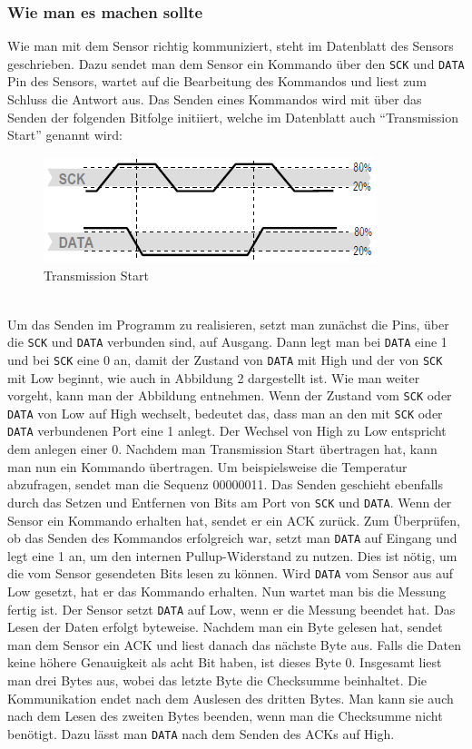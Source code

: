 \documentclass[]{article}
\begin{document}
\subsubsection{Wie man es machen sollte}
Wie man mit dem Sensor richtig kommuniziert, steht im Datenblatt des Sensors geschrieben. Dazu sendet man dem Sensor ein Kommando über den \texttt{SCK} und \texttt{DATA} Pin des Sensors, wartet auf die Bearbeitung des Kommandos und liest zum Schluss die Antwort aus. 
Das Senden eines Kommandos wird mit über das Senden der folgenden Bitfolge initiiert, welche im Datenblatt auch "`Transmission Start"' genannt wird: 
\begin{figure}[h]
	\centering
	\includegraphics[width=0.5\columnwidth]{transmission_start.png}
	\caption{Transmission Start}
\end{figure}
\\ Um das Senden im Programm zu realisieren, setzt man zunächst die Pins, über die \texttt{SCK} und \texttt{DATA} verbunden sind, auf Ausgang. Dann legt man bei \texttt{DATA} eine 1 und bei \texttt{SCK} eine 0 an, damit der Zustand von \texttt{DATA} mit High und der von \texttt{SCK} mit Low beginnt, wie auch in Abbildung 2 dargestellt ist. Wie man weiter vorgeht, kann man der Abbildung entnehmen. Wenn der Zustand vom \texttt{SCK} oder \texttt{DATA} von Low auf High wechselt, bedeutet das, dass man an den mit \texttt{SCK} oder \texttt{DATA} verbundenen Port eine 1 anlegt. Der Wechsel von High zu Low entspricht dem anlegen einer 0. Nachdem man Transmission Start übertragen hat, kann man nun ein Kommando übertragen. Um beispielsweise die Temperatur abzufragen, sendet man die Sequenz 00000011. Das Senden geschieht ebenfalls durch das Setzen und Entfernen von Bits am Port von \texttt{SCK} und \texttt{DATA}. Wenn der Sensor ein Kommando erhalten hat, sendet er ein ACK zurück. Zum Überprüfen, ob das Senden des Kommandos erfolgreich war, setzt man \texttt{DATA} auf Eingang und legt eine 1 an, um den internen Pullup-Widerstand zu nutzen. Dies ist nötig, um die vom Sensor gesendeten Bits lesen zu können. Wird \texttt{DATA} vom Sensor aus auf Low gesetzt, hat er das Kommando erhalten. Nun wartet man bis die Messung fertig ist. Der Sensor setzt \texttt{DATA} auf Low, wenn er die Messung beendet hat. Das Lesen der Daten erfolgt byteweise. Nachdem man ein Byte gelesen hat, sendet man dem Sensor ein ACK und liest danach das nächste Byte aus. Falls die Daten keine höhere Genauigkeit als acht Bit haben, ist dieses Byte 0. Insgesamt liest man drei Bytes aus, wobei das letzte Byte die Checksumme beinhaltet. Die Kommunikation endet nach dem Auslesen des dritten Bytes. Man kann sie auch nach dem Lesen des zweiten Bytes beenden, wenn man die Checksumme nicht benötigt. Dazu lässt man \texttt{DATA} nach dem Senden des ACKs auf High. 
\end{document}
